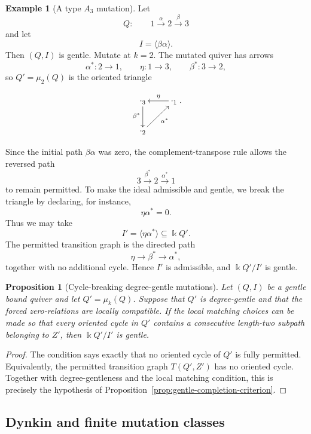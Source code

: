 \documentclass[11pt]{article}
\newcommand{\K}{\Bbbk}
\theoremstyle{plain}
\newtheorem{proposition}[theorem]{Proposition}
\theoremstyle{definition}
\newtheorem{example}[theorem]{Example}
\theoremstyle{remark}
\begin{document}
\begin{example}[A type \(A_3\) mutation]
\label{ex:A3-positive}
Let
\[
  Q:
  \qquad
  1\xrightarrow{\alpha}2\xrightarrow{\beta}3
\]
and let
\[
  I=\langle \beta\alpha\rangle.
\]
Then \((Q,I)\) is gentle.  Mutate at \(k=2\).  The mutated quiver has arrows
\[
  \alpha^*:2\to 1,
  \qquad
  \eta:1\to 3,
  \qquad
  \beta^*:3\to 2,
\]
so \(Q'=\mu_2(Q)\) is the oriented triangle

\begin{equation}\label{}
\nonumber   \xymatrix{
\cdot_{3} \ar[d]_{\beta^*} & \ar[l]_{\eta}\cdot_{1} \\
	\cdot_{2}  \ar[ur]_{\alpha^*}}.
  \end{equation}


Since the initial path \(\beta\alpha\) was zero, the complement-transpose rule
allows the reversed path
\[
  3\xrightarrow{\beta^*}2\xrightarrow{\alpha^*}1
\]
to remain permitted.  To make the ideal admissible and gentle, we break the
triangle by declaring, for instance,
\[
  \eta\alpha^*=0.
\]
Thus we may take
\[
  I'=\langle \eta\alpha^*\rangle\subseteq \K Q'.
\]
The permitted transition graph is the directed path
\[
  \eta\longrightarrow \beta^*\longrightarrow \alpha^*,
\]
together with no additional cycle.  Hence \(I'\) is admissible, and
\(\K Q'/I'\) is gentle.
\end{example}

\begin{proposition}[Cycle-breaking degree-gentle mutations]
\label{prop:cycle-breaking-gentle}
Let \((Q,I)\) be a gentle bound quiver and let \(Q'=\mu_k(Q)\).  Suppose that
\(Q'\) is degree-gentle and that the forced zero-relations are locally
compatible.  If the local matching choices can be made so that every oriented
cycle in \(Q'\) contains a consecutive length-two subpath belonging to \(Z'\),
then \(\K Q'/I'\) is gentle.
\end{proposition}

\begin{proof}
The condition says exactly that no oriented cycle of \(Q'\) is fully permitted.
Equivalently, the permitted transition graph \(T(Q',Z')\) has no oriented
cycle.  Together with degree-gentleness and the local matching condition, this
is precisely the hypothesis of Proposition~\ref{prop:gentle-completion-criterion}.
\end{proof}

\subsection{Dynkin and finite mutation classes}
\end{document}
